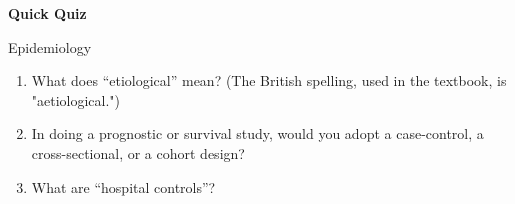 \hspace*{3in}{Student Name:}

\bigskip

\bigskip

\centerline{\Large \bfseries Quick Quiz}

\bigskip

\centerline{\large \sf Epidemiology}

\bigskip

\begin{enumerate}
\item What does “etiological” mean?  (The British spelling, used in the textbook, is "aetiological.")

\vspace*{.5in}
\item  In doing a prognostic or survival study, would you adopt a case-control, a cross-sectional, or a cohort design?

\vspace*{.5in}
\item What are “hospital controls”?
\vspace*{.5in}
\end{enumerate}